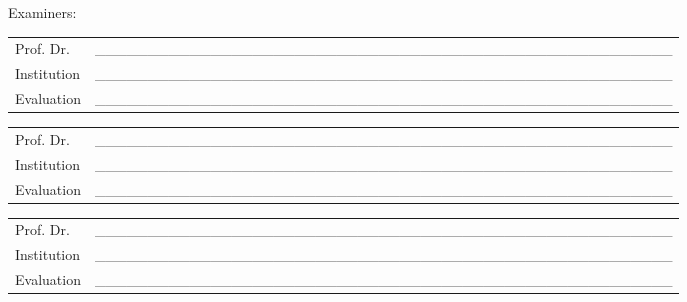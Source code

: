 \begin{folhadeaprovacao}[\folhadeaprovacaoname]
\vspace{\bigskipamount}
Examiners:

\vspace{\tinyskipamount}
\begin{tabular}{m{2cm} P{14cm}}
  Prof. Dr. & \_\_\_\_\_\_\_\_\_\_\_\_\_\_\_\_\_\_\_\_\_\_\_\_\_\_\_\_\_\_\_\_\_\_\_\_\_\_\_\_\_\_\_\_\_\_\_\_\_\_\_\_\_\_\_ \\
  Institution & \_\_\_\_\_\_\_\_\_\_\_\_\_\_\_\_\_\_\_\_\_\_\_\_\_\_\_\_\_\_\_\_\_\_\_\_\_\_\_\_\_\_\_\_\_\_\_\_\_\_\_\_\_\_\_ \\
  Evaluation & \_\_\_\_\_\_\_\_\_\_\_\_\_\_\_\_\_\_\_\_\_\_\_\_\_\_\_\_\_\_\_\_\_\_\_\_\_\_\_\_\_\_\_\_\_\_\_\_\_\_\_\_\_\_\_ \\
\end{tabular}

\vspace{\smallskipamount}
\begin{tabular}{m{2cm} P{14cm}}
  Prof. Dr. & \_\_\_\_\_\_\_\_\_\_\_\_\_\_\_\_\_\_\_\_\_\_\_\_\_\_\_\_\_\_\_\_\_\_\_\_\_\_\_\_\_\_\_\_\_\_\_\_\_\_\_\_\_\_\_ \\
  Institution & \_\_\_\_\_\_\_\_\_\_\_\_\_\_\_\_\_\_\_\_\_\_\_\_\_\_\_\_\_\_\_\_\_\_\_\_\_\_\_\_\_\_\_\_\_\_\_\_\_\_\_\_\_\_\_ \\
  Evaluation & \_\_\_\_\_\_\_\_\_\_\_\_\_\_\_\_\_\_\_\_\_\_\_\_\_\_\_\_\_\_\_\_\_\_\_\_\_\_\_\_\_\_\_\_\_\_\_\_\_\_\_\_\_\_\_ \\
\end{tabular}

\vspace{\smallskipamount}
\begin{tabular}{m{2cm} P{14cm}}
  Prof. Dr. & \_\_\_\_\_\_\_\_\_\_\_\_\_\_\_\_\_\_\_\_\_\_\_\_\_\_\_\_\_\_\_\_\_\_\_\_\_\_\_\_\_\_\_\_\_\_\_\_\_\_\_\_\_\_\_ \\
  Institution & \_\_\_\_\_\_\_\_\_\_\_\_\_\_\_\_\_\_\_\_\_\_\_\_\_\_\_\_\_\_\_\_\_\_\_\_\_\_\_\_\_\_\_\_\_\_\_\_\_\_\_\_\_\_\_ \\
  Evaluation & \_\_\_\_\_\_\_\_\_\_\_\_\_\_\_\_\_\_\_\_\_\_\_\_\_\_\_\_\_\_\_\_\_\_\_\_\_\_\_\_\_\_\_\_\_\_\_\_\_\_\_\_\_\_\_ \\
\end{tabular}
\endgroup
\end{folhadeaprovacao}


